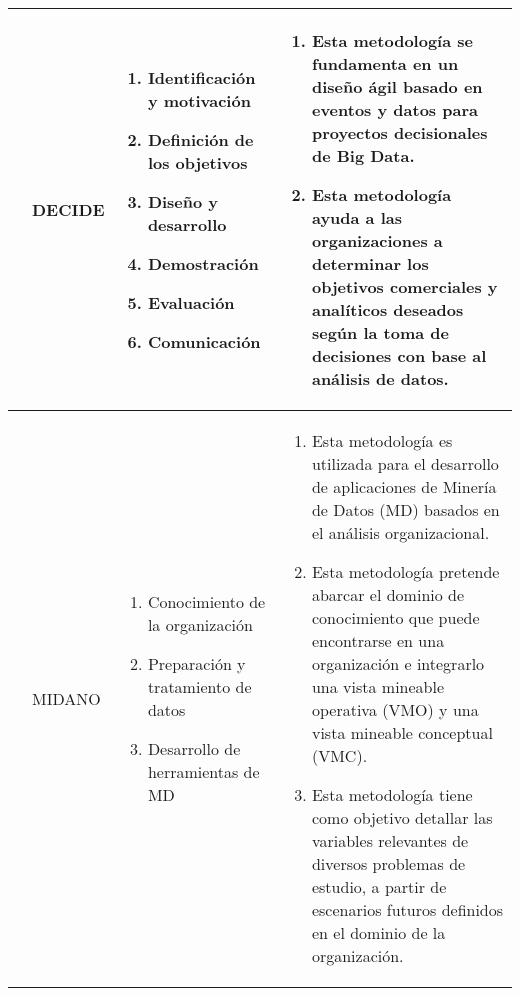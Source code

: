 \begin{table*}[!htb]
	\footnotesize
	\begin{threeparttable}	
		\begin{tabular}{p{1cm} p{2cm} p{5cm} p{6.5cm}} \toprule
			\cite{Sfaxi2020}
			&DECIDE
			&  \begin{enumerate}
				\item Identificación y motivación
				\item Definición de los objetivos
				\item Diseño y desarrollo
				\item Demostración
				\item Evaluación
				\item Comunicación
			\end{enumerate}
			& \begin{enumerate}
				\item Esta metodología se fundamenta en un diseño ágil basado en eventos y datos para proyectos decisionales de Big Data. 
				\item Esta metodología ayuda a las organizaciones a determinar los objetivos comerciales y analíticos deseados según la toma de decisiones con base al análisis de datos.
			\end{enumerate}
			\\ \hline
			\cite{Pacheco2014}
			&MIDANO
			&  \begin{enumerate}
				\item Conocimiento de la organización
				\item Preparación y tratamiento de datos
				\item Desarrollo de herramientas de MD
			\end{enumerate}
			& \begin{enumerate}
				\item Esta metodología es utilizada para el desarrollo de aplicaciones de Minería de Datos (MD) basados en el análisis organizacional.
				\item Esta metodología pretende abarcar el dominio de conocimiento que puede encontrarse en una organización e integrarlo una vista mineable operativa (VMO) y una vista mineable conceptual (VMC).
				\item Esta metodología tiene como objetivo detallar las variables relevantes de diversos problemas de estudio, a partir de escenarios futuros definidos en el dominio de la organización.
			\end{enumerate}
			\\ \hline
			

\end{tabular}
\end{threeparttable}
\end{table*}
